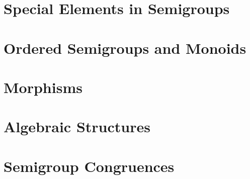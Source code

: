 \chapter {Special Elements in Semigroups}


\chapter {Ordered Semigroups and Monoids}


\chapter {Morphisms}


\chapter {Algebraic Structures}


\chapter {Semigroup Congruences}


